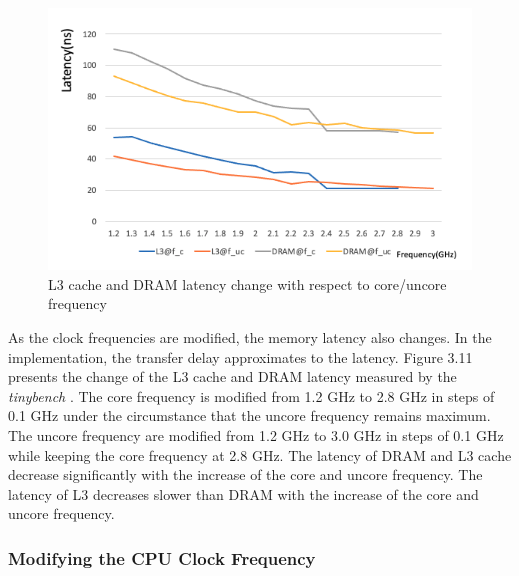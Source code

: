 \begin{figure} [h] %
	\centering   %
	\includegraphics[width=15cm]{pictures/latency}
	\caption{L3 cache and DRAM latency change with respect to core/uncore frequency}
\end{figure}

As the clock frequencies are modified, the memory latency also changes. In the implementation, the transfer delay approximates to the latency. Figure 3.11 presents the change of the L3 cache and DRAM latency measured by the \textit{tinybench} \cite{38}. The core frequency is modified from 1.2 GHz to 2.8 GHz in steps of 0.1 GHz under the circumstance that the uncore frequency remains maximum. The uncore frequency are modified from 1.2 GHz to 3.0 GHz in steps of 0.1 GHz while keeping the core frequency at 2.8 GHz. The latency of DRAM and L3 cache decrease significantly with the increase of the core and uncore frequency. The latency of L3 decreases slower than DRAM with the increase of the core and uncore frequency. 


\subsubsection{Modifying the CPU Clock Frequency}


